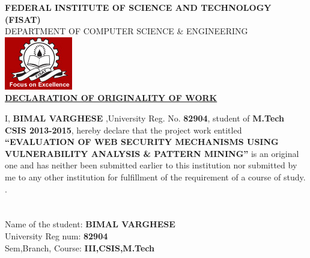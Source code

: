 \begin{center}
 \textbf{FEDERAL INSTITUTE OF SCIENCE AND TECHNOLOGY}\\
 \textbf{(FISAT)}\\[1\baselineskip]
 {DEPARTMENT OF COMPUTER SCIENCE \& ENGINEERING}\\[2cm]
 \includegraphics[scale=1.1] {fisat.jpg} \\[2\baselineskip]
 \underline{\textbf{DECLARATION OF ORIGINALITY OF WORK}} \\[2\baselineskip]
 \end{center}
\vspace{1.5cm}
I, \textbf{BIMAL VARGHESE} ,University Reg. No. \textbf{82904}, student of \textbf{M.Tech CSIS 2013-2015}, hereby declare that the project work entitled \textbf{``EVALUATION OF WEB SECURITY MECHANISMS
	USING VULNERABILITY ANALYSIS \& PATTERN MINING''} is an original one and has neither been submitted earlier to this institution nor submitted by me to any other institution for fulfillment of the requirement of a course of study.
.\\\\\\
Name of the student: \textbf{BIMAL VARGHESE}\\
University Reg num: \textbf{82904}\\
Sem,Branch, Course: \textbf{III,CSIS,M.Tech}
\\
